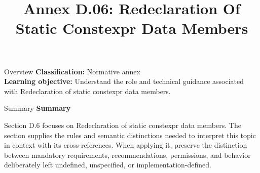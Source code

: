 \documentclass[10pt,letterpaper]{article}
\title{Annex D.06: Redeclaration Of Static Constexpr Data Members}
\author{}
\date{}
\begin{document}
\maketitle
\begin{CornellOverviewBox}{Overview}
\textbf{Classification:} Normative annex\\[2pt]
\textbf{Learning objective:} Understand the role and technical guidance associated with Redeclaration of static constexpr data members.
\end{CornellOverviewBox}\begin{CornellSummaryBox}{Summary}
{\sffamily\bfseries\color{Accent} Summary}\par\vspace{3pt}Section D.6 focuses on Redeclaration of static constexpr data members. The section supplies the rules and semantic distinctions needed to interpret this topic in context with its cross-references. When applying it, preserve the distinction between mandatory requirements, recommendations, permissions, and behavior deliberately left undefined, unspecified, or implementation-defined.
\end{CornellSummaryBox}
\end{document}
